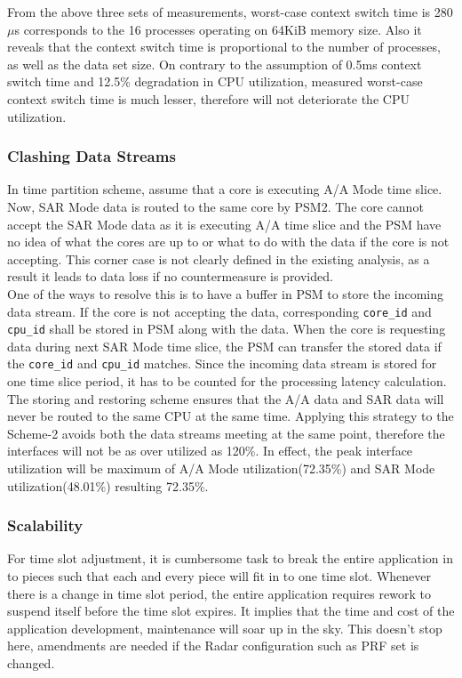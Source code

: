 From the above three sets of measurements, worst-case context switch time is 280$\mu$s corresponds to the 16 processes operating on 64KiB memory size. Also it reveals that the context switch time is proportional to the number of processes, as well as the data set size. On contrary to the assumption of 0.5ms context switch time and 12.5\% degradation in CPU utilization, measured worst-case context switch time is much lesser, therefore will not deteriorate the CPU utilization.

\subsubsection{Clashing Data Streams}
In time partition scheme, assume that a core is executing A/A Mode time slice. Now, SAR Mode data is routed to the same core by PSM2. The core cannot accept the SAR Mode data as it is executing A/A time slice and the PSM have no idea of what the cores are up to or what to do with the data if the core is not accepting. This corner case is not clearly defined in the existing analysis, as a result it leads to data loss if no countermeasure is provided. \\[0.2cm]
One of the ways to resolve this is to have a buffer in PSM to store the incoming data stream. If the core is not accepting the data, corresponding \verb|core_id| and \verb|cpu_id| shall be stored in PSM along with the data. When the core is requesting data during next SAR Mode time slice, the PSM can transfer the stored data if the \verb|core_id| and \verb|cpu_id| matches. Since the incoming data stream is stored for one time slice period, it has to be counted for the processing latency calculation. The storing and restoring scheme ensures that the A/A data and SAR data will never be routed to the same CPU at the same time. Applying this strategy to the Scheme-2 avoids both the data streams meeting at the same point, therefore the interfaces will not be as over utilized as 120\%. In effect, the peak interface utilization will be maximum of A/A Mode utilization(72.35\%) and SAR Mode utilization(48.01\%) resulting 72.35\%.

\subsubsection{Scalability}
\label{sss:mm:cons:scalability}
For time slot adjustment, it is cumbersome task to break the entire application in to pieces such that each and every piece will fit in to one time slot. Whenever there is a change in time slot period, the entire application requires rework to suspend itself before the time slot expires. It implies that the time and cost of the application development, maintenance will soar up in the sky. This doesn't stop here, amendments are needed if the Radar configuration such as PRF set is changed.


